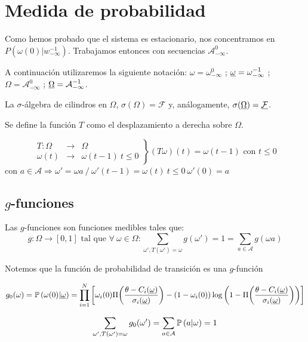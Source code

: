 \section{Medida de probabilidad}

Como hemos probado que el sistema es estacionario, nos concentramos en $P(\omega(0)|w_{-\infty}^{-1})$. Trabajamos entonces con secuencias $\mathcal{A}_{-\infty}^{0}$.

A continuación utilizaremos la siguiente notación: $\omega=\omega_{-\infty}^0$ ; $\underline{\omega}=\omega_{-\infty}^{-1}$ ; $\Omega=\mathcal{A}_{-\infty}^0$ ; $\underline{\Omega}=\mathcal{A}_{-\infty}^{-1}$.

La $\sigma$-álgebra de cilindros en $\Omega$, $\sigma(\Omega)=\mathcal{F}$ y, análogamente, $\sigma(\underline{\Omega})=\underline{\mathcal{F}}$.

Se define la función $T$ como el desplazamiento a derecha sobre $\Omega$.

\begin{equation}
    \left. \begin{array}{rcl}
         T: \Omega & \rightarrow & \Omega  \\
         \omega(t) & \rightarrow & \omega(t-1) \  t \leq 0
    \end{array} \right\} (T\omega)(t) = \omega(t-1) \text{ con }  t\leq 0
\end{equation}
con $a \in \mathcal{A} \Longrightarrow \omega'=\omega a \ / \ \omega'(t-1) = \omega(t) \  t \leq 0  \  \omega'(0) = a$


\subsection{$g$-funciones} 

Las $g$-funciones son funciones medibles tales que:
\begin{equation}
    g: \Omega \rightarrow [0,1] \text{ tal que } \forall \ \omega \in \Omega :
    \sum_{\omega', T(\omega')=\omega} g(\omega') = 1 = \sum_{a\in\mathcal{A}} g(\omega a)
\end{equation}

Notemos que la función de probabilidad de transición es una $g$-función

\begin{equation}
    g_0(\omega) = \mathbb{P}\left(\omega(0)|\underline{\omega}\right) = 
    \prod_{i=1}^N \left[ \omega_i(0) \Pi\!\left(\frac{\theta-C_i(\underline{\omega})}{\sigma_i(\underline{\omega})}\right) - (1-\omega_i(0))\log\left(1-\Pi\!\left(\frac{\theta-C_i(\underline{\omega})}{\sigma_i(\underline{\omega})}\right) \right)\right]
    \label{eqn:gof}
\end{equation}

\begin{equation}
   \sum_{\omega', T(\omega')=\omega} g_0(\omega') = 
   \sum_{a \in \mathcal{A}} \mathbb{P}\left(a|\omega\right) = 1
\end{equation}

